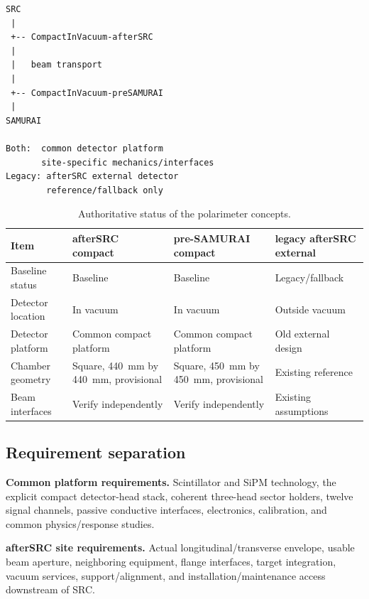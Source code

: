 \documentclass[10pt,letterpaper]{article}
\begin{document}
\begin{center}
\begin{minipage}{0.72\textwidth}
\begin{Verbatim}[fontsize=\small,frame=single]
SRC
 |
 +-- CompactInVacuum-afterSRC
 |
 |   beam transport
 |
 +-- CompactInVacuum-preSAMURAI
 |
SAMURAI

Both:  common detector platform
       site-specific mechanics/interfaces
Legacy: afterSRC external detector
        reference/fallback only
\end{Verbatim}
\end{minipage}
\end{center}

\begin{table}[htbp]
  \centering
  \small
  \caption{Authoritative status of the polarimeter concepts.}
  \begin{tabularx}{\textwidth}{L{0.22\textwidth}Y Y Y}
    \toprule
    Item & afterSRC compact & pre-SAMURAI compact & legacy afterSRC external \\
    \midrule
    Baseline status & Baseline & Baseline & Legacy/fallback \\
    Detector location & In vacuum & In vacuum & Outside vacuum \\
    Detector platform & Common compact platform & Common compact platform & Old external design \\
    Chamber geometry & Square, \SI{440}{\milli\meter} by \SI{440}{\milli\meter},
      provisional & Square, \SI{450}{\milli\meter} by \SI{450}{\milli\meter},
      provisional & Existing reference \\
    Beam interfaces & Verify independently & Verify independently & Existing assumptions \\
    \bottomrule
  \end{tabularx}
\end{table}

\subsection{Requirement separation}

\textbf{Common platform requirements.}
Scintillator and SiPM technology, the explicit compact detector-head stack, coherent
three-head sector holders, twelve signal channels, passive conductive interfaces,
electronics, calibration, and common physics/response studies.

\textbf{afterSRC site requirements.}
Actual longitudinal/transverse envelope, usable beam aperture, neighboring equipment,
flange interfaces, target integration, vacuum services, support/alignment, and
installation/maintenance access downstream of SRC.
\end{document}
